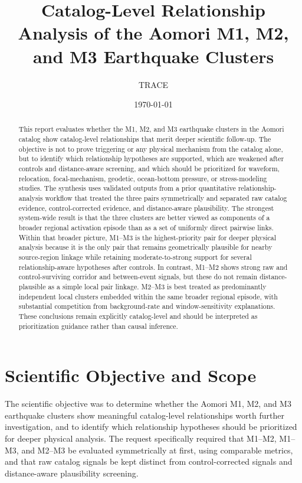\documentclass[11pt]{article}
\title{Catalog-Level Relationship Analysis of the Aomori M1, M2, and M3 Earthquake Clusters}
\author{TRACE}
\date{\today}
\begin{document}
\maketitle

\begin{abstract}
This report evaluates whether the M1, M2, and M3 earthquake clusters in the Aomori catalog show catalog-level relationships that merit deeper scientific follow-up. The objective is not to prove triggering or any physical mechanism from the catalog alone, but to identify which relationship hypotheses are supported, which are weakened after controls and distance-aware screening, and which should be prioritized for waveform, relocation, focal-mechanism, geodetic, ocean-bottom pressure, or stress-modeling studies. The synthesis uses validated outputs from a prior quantitative relationship-analysis workflow that treated the three pairs symmetrically and separated raw catalog evidence, control-corrected evidence, and distance-aware plausibility. The strongest system-wide result is that the three clusters are better viewed as components of a broader regional activation episode than as a set of uniformly direct pairwise links. Within that broader picture, M1--M3 is the highest-priority pair for deeper physical analysis because it is the only pair that remains geometrically plausible for nearby source-region linkage while retaining moderate-to-strong support for several relationship-aware hypotheses after controls. In contrast, M1--M2 shows strong raw and control-surviving corridor and between-event signals, but these do not remain distance-plausible as a simple local pair linkage. M2--M3 is best treated as predominantly independent local clusters embedded within the same broader regional episode, with substantial competition from background-rate and window-sensitivity explanations. These conclusions remain explicitly catalog-level and should be interpreted as prioritization guidance rather than causal inference.
\end{abstract}

\section{Scientific Objective and Scope}
The scientific objective was to determine whether the Aomori M1, M2, and M3 earthquake clusters show meaningful catalog-level relationships worth further investigation, and to identify which relationship hypotheses should be prioritized for deeper physical analysis. The request specifically required that M1--M2, M1--M3, and M2--M3 be evaluated symmetrically at first, using comparable metrics, and that raw catalog signals be kept distinct from control-corrected signals and distance-aware plausibility screening.
\end{document}

